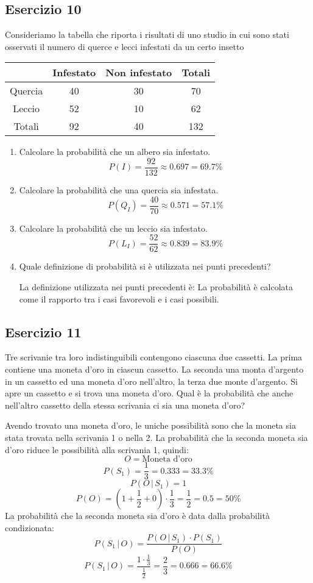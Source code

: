 \documentclass[a4paper]{article}
\theoremstyle{break}
\theoremstyle{break}
\theoremstyle{break}
\theoremstyle{break}
\begin{document}
\subsection{Esercizio 10}
Consideriamo la tabella che riporta i risultati di uno studio in cui sono stati osservati il numero di
querce e lecci infestati da un certo insetto
\begin{table}[H]
  \centering
  \begin{tabular}{c|ccc}
    & Infestato & Non infestato & Totali \\
    \hline
    Quercia & 40 & 30 & 70 \\
    Leccio & 52 & 10 & 62 \\
    \hline
    Totali & 92 & 40 & 132 
  \end{tabular}
\end{table}
\begin{enumerate}
  \item Calcolare la probabilità che un albero sia infestato.
    \[
    P(I) = \frac{92}{132} \approx 0.697 = 69.7\%
    \] 
  \item Calcolare la probabilità che una quercia sia infestata.
    \[
    P(Q_I) = \frac{40}{70} \approx 0.571 = 57.1\%
    \] 
  \item Calcolare la probabilità che un leccio sia infestato.
    \[
    P(L_I) = \frac{52}{62} \approx 0.839 = 83.9\%
    \] 
  \item Quale definizione di probabilità si è utilizzata nei punti precedenti?
    
    \vspace{1em}
    La definizione utilizzata nei punti precedenti è: La probabilità è calcolata come
    il rapporto tra i casi favorevoli e i casi possibili.
\end{enumerate}

\subsection{Esercizio 11}
Tre scrivanie tra loro indistinguibili contengono ciascuna due cassetti. La prima 
contiene una moneta d'oro in ciascun cassetto. La seconda una monta d'argento in un
cassetto ed una moneta d'oro nell'altro, la terza due monte d'argento. Si apre un 
cassetto e si trova una moneta d'oro. Qual è la probabilità che anche nell'altro cassetto
della stessa scrivania ci sia una moneta d'oro?

\vspace{1em}
\noindent Avendo trovato una moneta d'oro, le uniche possibilità sono che la moneta sia stata
trovata nella scrivania 1 o nella 2. La probabilità che la seconda moneta sia d'oro riduce
le possibilità alla scrivania 1, quindi:
\[
  O = \text{Moneta d'oro}
\]
\[
  P(S_1) = \frac{1}{3} = 0.333 = 33.3\%
\] 
\[
  P(O\,|\,S_1) = 1
\] 
\[
  P(O) = \left( 1 + \frac{1}{2} + 0 \right) \cdot \frac{1}{3} = \frac{1}{2} = 0.5 = 50\%
\] 
La probabilità che la seconda moneta sia d'oro è data dalla probabilità condizionata:
\[
  P(S_1\,|\,O) = \frac{P(O\,|\,S_1) \cdot P(S_1)}{P(O)}
\] 
\[
  P(S_1\,|\,O) = \frac{1 \cdot \frac{1}{3}}{\frac{1}{2}} = \frac{2}{3} = 0.666 = 66.6\%
\] 
\end{document}
